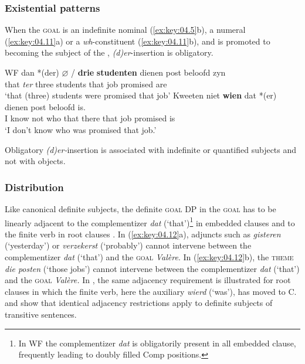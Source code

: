 \documentclass[output=paper]{langsci/langscibook}
\begin{document}
\subsubsection{Existential patterns}

When the \textsc{goal} is an indefinite nominal (\ref{ex:key:04.5}b), a numeral
(\ref{ex:key:04.11}a) or a \emph{wh}{}-constituent (\ref{ex:key:04.11}b), and is promoted
to becoming the subject of the ,  \emph{(d)er}{}-insertion is
obligatory.

\ea\label{ex:key:04.11}\glsdesc{WF}
    \ea
	\gll   dan *(der) $\varnothing$ / \textbf{drie} \textbf{studenten}   dienen post   beloofd zyn\\
    that \hphantom{*}\emph{ter} {} {} three students   that job   promised are\\
	\glt     ‘that (three) students were promised that job’
    \ex
	\gll   Kweeten   niet   \textbf{wien}   dat *(er)   dienen post   beloofd   is.\\
    {I know}  not   who   that \hphantom{*(}there   that job   promised   is\\
	\glt     ‘I don’t know who was promised that job.’
    \z
\z

Obligatory \emph{(d)er-}insertion is associated with indefinite or quantified
subjects and not with objects.

\subsubsection{Distribution}

Like canonical definite subjects, the definite \textsc{goal} DP in the
\textsc{goal}  has to be linearly adjacent to the complementizer
\emph{dat} (‘that’)\footnote{In \gls{WF} the complementizer
    \emph{dat} is obligatorily present in all embedded clause, frequently
leading to doubly filled Comp positions.} in embedded clauses
 and to the finite verb in root clauses .
In (\ref{ex:key:04.12}a), adjuncts such as \emph{gisteren} (‘yesterday’) or
\emph{verzekerst} (‘probably’) cannot intervene between the complementizer
\emph{dat} (‘that’) and the \textsc{goal} \emph{Valère}. In
(\ref{ex:key:04.12}b), the \textsc{theme} \emph{die posten} (‘those jobs’)
cannot intervene between the complementizer \emph{dat} (‘that’) and the
\textsc{goal} \emph{Valère.} In , the same adjacency
requirement is illustrated for root clauses in which the finite verb, here the
auxiliary \emph{wierd} (‘was’), has moved to C.   and
 show that identical adjacency restrictions apply to definite
subjects of transitive sentences.
\end{document}
